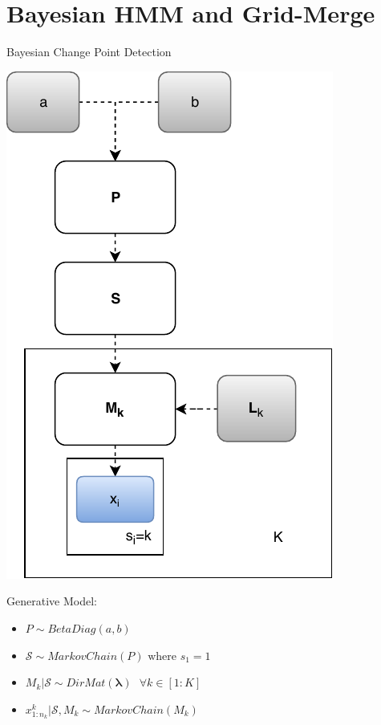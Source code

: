 \documentclass{beamer}
\begin{document}
\section{Bayesian HMM and Grid-Merge}
\begin{frame}{Bayesian Change Point Detection}

\begin{minipage}{.4\linewidth} 
\centerline{\includegraphics[scale=0.6]{Bayesian_Change_Point_Detection.pdf}}
\end{minipage}
\begin{minipage}{.5\linewidth}
\fontsize{8}{7.2}\selectfont
Generative Model:
\begin{itemize}
	\item $P           \sim BetaDiag(a,b)$
	\item $\mathcal{S} \sim MarkovChain(P) \text{ where } s_1=1$
	\item $M_k | \mathcal{S}      \sim  DirMat(\boldsymbol{\lambda}) \text{ } \forall k \in [1:K]$
	\item $x^k_{1:n_k}|\mathcal{S},M_k \sim MarkovChain(M_k)$
\end{itemize}
\vspace{1cm}


\end{minipage}
\end{frame}
\end{document}
